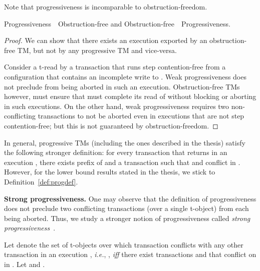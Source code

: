 Note that progressiveness is incomparable to obstruction-freedom.
\begin{observation}
Progressiveness~~Obstruction-free and Obstruction-free~~Progressiveness.
\end{observation}
\begin{proof}
We can show that there exists an execution exported by an obstruction-free TM, but not by any
progressive TM and vice-versa.

Consider a t-read  by a transaction  that runs step contention-free
from a configuration that contains an incomplete write to . Weak progressiveness
does not preclude  from being aborted in such an execution.
Obstruction-free TMs however, must ensure that  must complete its read of  without blocking or aborting in such executions.
On the other hand, weak progressiveness requires two non-conflicting transactions to not be aborted even
in executions that are not step contention-free; but this is not guaranteed by obstruction-freedom.
\end{proof}
In general, progressive TMs (including the ones described in the thesis) satisfy the following stronger definition: 
for every transaction  that returns  in an execution , 
there exists prefix  of  and a transaction  such that  and 
conflict in . However, for the lower bound results stated in the thesis, we stick to Definition~\ref{def:progdef}.

\vspace{1mm}\noindent\textbf{Strong progressiveness.}
One may observe that the definition of progressiveness does not preclude two conflicting 
transactions (over a single t-object) from each being aborted.
Thus, we study a stronger notion of progressiveness called \emph{strong progressiveness}~\cite{tm-book}.

Let  denote the set of t-objects over which transaction  conflicts with any other 
transaction in an execution ,
\emph{i.e.}, , \emph{iff} there exist transactions  and 
that conflict on  in .
Let  and .

